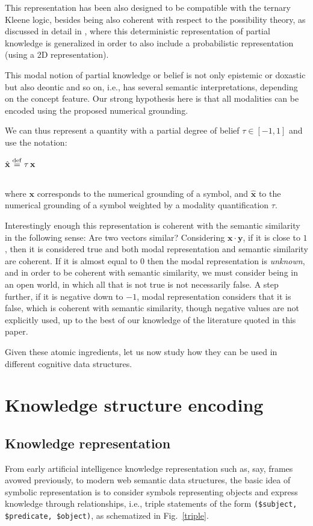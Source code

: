 \documentclass[sn-mathphys]{sn-jnl}
\newcommand{\defq}{\stackrel {\rm def}{=}}
\newcommand{\eqline}[1]{~\vspace{0.1cm}\\\centerline{$#1$}\vspace{0.1cm}\\}
\begin{document}
This representation has been also designed to be compatible with the ternary Kleene logic, besides being also coherent with respect to the possibility theory, as discussed in detail in \cite{vieville_representation_2022}, where this deterministic representation of partial knowledge is generalized in order to also include a probabilistic representation (using a 2D representation). 

This modal notion of partial knowledge or belief is not only epistemic or doxastic but also deontic and so on, i.e., has several semantic interpretations, depending on the concept feature. Our strong hypothesis here is that all modalities can be encoded using the proposed numerical grounding. 

We can thus represent a quantity with a partial degree of belief $\tau \in [-1, 1]$ and use the notation:
\eqline{\hat{\mathbf{x}} \defq \tau \, \mathbf{x}}
where $\mathbf{x}$ corresponds to the numerical grounding of a symbol, and $\hat{\mathbf{x}}$ to the numerical grounding of a symbol weighted by a modality quantification $\tau$.

Interestingly enough this representation is coherent with the semantic similarity in the following sense: Are two vectors similar? Considering $\mathbf{x} \cdot \mathbf{y}$, if it is close to $1$, then it is considered true and both modal representation and semantic similarity are coherent. If it is almost equal to $0$ then the modal representation is {\em unknown}, and in order to be coherent with semantic similarity, we must consider being in an open world, in which all that is not true is not necessarily false. A step further, if it is negative down to $-1$, modal representation considers that it is false, which is coherent with semantic similarity, though negative values are not explicitly used, up to the best of our knowledge of the literature quoted in this paper.

Given these atomic ingredients, let us now study how they can be used in different cognitive data structures.

\section{Knowledge structure encoding}

\subsection{Knowledge representation}

From early artificial intelligence knowledge representation such as, say, frames avowed previously, to modern web semantic data structures, the basic idea of symbolic representation is to consider symbols representing objects and express knowledge through relationships, i.e., triple statements of the form {\tt (\$subject, \$predicate, \$object)}, as schematized in Fig.~\ref{triple}.
\end{document}
